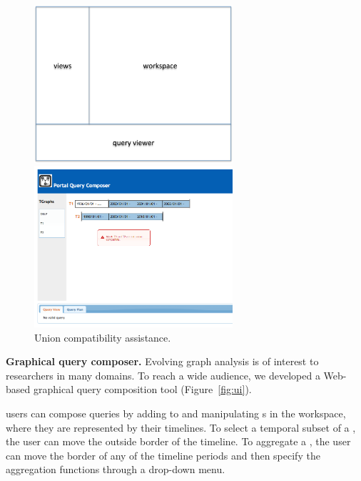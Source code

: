 
\begin{figure}[th!]
\centering
\begin{minipage}{3.2in}
  \includegraphics[width=2.9in]{figs/ui.pdf}
  \caption{Graphical query composition.}
  \label{fig:ui}
\end{minipage}
\begin{minipage}{3.2in}
  \includegraphics[width=2.9in]{figs/uierror.png}
  \caption{Union compatibility assistance.}
  \label{fig:uierror}
\end{minipage}
\end{figure}

{\bf Graphical query composer.} Evolving graph analysis is of interest
to researchers in many domains.  To reach a wide audience,
we developed a Web-based graphical query composition tool \qlui
(Figure~\ref{fig:ui}).

\qlui users can compose queries by adding to and manipulating \tg{}s
in the workspace, where they are represented by their timelines.  To
select a temporal subset of a \tg, the user can move the outside
border of the timeline.  To aggregate a \tg, the user can move the
border of any of the timeline periods and then specify the aggregation
functions through a drop-down menu.

